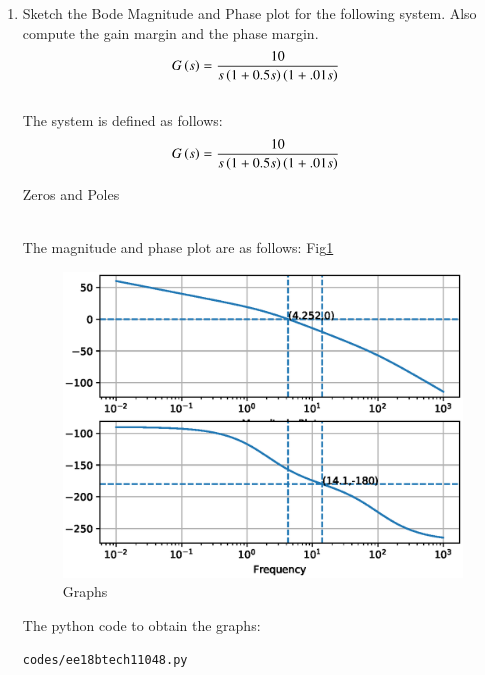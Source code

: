 \begin{enumerate}[label=\thesection.\arabic*.,ref=\thesection.\theenumi]

\item Sketch the Bode Magnitude and Phase plot for the following system. Also compute the gain margin and the phase margin.
\begin{align}
G\left(s\right) &= \frac{10}{s\left(1+0.5s\right)\left(1+.01s\right)}
\label{eq:ee18btech11048_2}
\end{align}
\\
\solution 
The system is defined as follows:
\begin{align}
G\left(s\right) &= \frac{10}{s\left(1+0.5s\right)\left(1+.01s\right)}
\end{align}
\begin{table}[!ht]
\centering

\caption{Zeros and Poles}
\label{table:ee18btech11048}
\end{table}\\
The magnitude and phase plot are as follows: Fig\ref{fig:ee18btech11048} 
\begin{figure}[!h]
\centering
  \includegraphics[width=\columnwidth]{./figs/ee18btech11048.eps}
  \caption{Graphs}
  \label{fig:ee18btech11048}
\end{figure}

The python code to obtain the graphs:

\begin{lstlisting}
codes/ee18btech11048.py
\end{lstlisting}


\end{enumerate}
